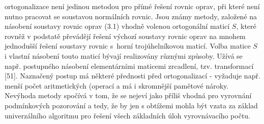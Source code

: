 \noindent\Pozn{}
 ortogonalizace není jedinou metodou pro
přímé řešení rovnic oprav, při které není nutno pracovat se soustavou
normálních rovnic. Jsou známy metody, založené na násobení soustavy
rovnic oprav (3.1) vhodně volenou ortogonální maticí $S$, které rovněž
v podstatě převádějí řešení výchozí soustavy rovnic oprav na mnohem
jednodušší řešení soustavy rovnic s~horní trojúhelníkovou
maticí. Volba matice $S$ i vlastní násobení touto maticí bývají
realizovány různými způsoby. Užívá se např. postupného násobení
elementárními maticemi zrcadlení, tzv. 
transformací [51].  Naznačený postup má některé přednosti před
 ortogonalizací - vyžaduje např. menší počet
aritmetických (operací a má i skromnější pamětové nároky. Nevýhoda
metody spočívá v tom, že se nejeví jako příliš vhodná pro vyrovnání
podmínkových pozorování a tedy, že by jen s obtížemi mohla být vzata
za základ univerzálního algoritmu pro řešení všech základních úloh
vyrovnávacího počtu.
